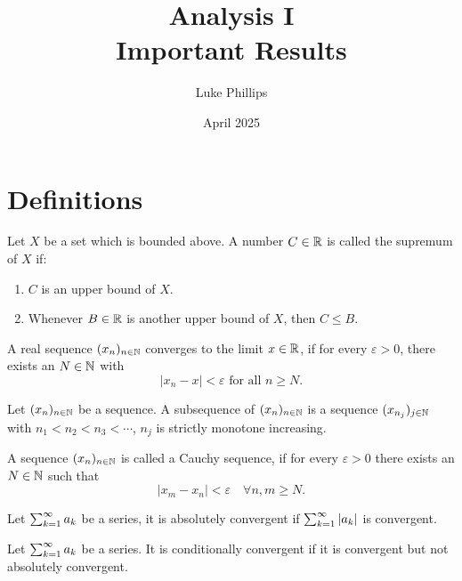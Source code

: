 \documentclass[10pt, a4paper]{article}
\title{Analysis I \\
    \large Important Results}
\author{Luke Phillips}
\date{April 2025}
\begin{document}
\maketitle

\newpage

\tableofcontents

\newpage

\section{Definitions}

\begin{definition}
    Let $X$ be a set which is bounded above.
    A number $C \in \mathbb{R}$ is called the supremum of $X$ if:
    \begin{enumerate}[label = (\roman*)]
        \item $C$ is an upper bound of $X$.

        \item Whenever $B \in \mathbb{R}$ is another upper bound of $X$,
        then $C \leq B$.
    \end{enumerate}
\end{definition}

\begin{definition}
    A real sequence $(x_n)_{n \in \mathbb{N}}$ converges to the limit $x \in \mathbb{R}$,
    if for every $\varepsilon > 0$,
    there exists an $N \in \mathbb{N}$ with
    \[
    |x_n - x| < \varepsilon\text{ for all } n \geq N.
    \]
\end{definition}

\begin{definition}
    Let $(x_n)_{n \in \mathbb{N}}$ be a sequence.
    A subsequence of $(x_n)_{n \in \mathbb{N}}$ is a sequence $(x_{n_j})_{j \in \mathbb{N}}$ with $n_1 < n_2 < n_3 < \dotsi$,
    $n_j$ is strictly monotone increasing.
\end{definition}

\begin{definition}
    A sequence $(x_n)_{n \in \mathbb{N}}$ is called a Cauchy sequence,
    if for every $\varepsilon > 0$ there exists an $N \in \mathbb{N}$ such that
    \[
    |x_m - x_n| < \varepsilon\quad\forall n, m \geq N.
    \]
\end{definition}

\begin{definition}
    Let $\sum_{k = 1}^{\infty} a_k$ be a series,
    it is absolutely convergent if $\sum_{k = 1}^{\infty}|a_k|$ is convergent.
\end{definition}

\begin{definition}
    Let $\sum_{k = 1}^{\infty} a_k$ be a series.
    It is conditionally convergent if it is convergent but not absolutely convergent.
\end{definition}
\end{document}
